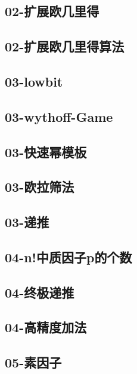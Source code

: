 \documentclass[10pt,a4paper]{article}
\begin{document}
\subsection{02-扩展欧几里得}

\subsection{02-扩展欧几里得算法}

\subsection{03-lowbit}

\subsection{03-wythoff-Game}

\subsection{03-快速幂模板}

\subsection{03-欧拉筛法}

\subsection{03-递推}

\subsection{04-n!中质因子p的个数}

\subsection{04-终极递推}

\subsection{04-高精度加法}

\subsection{05-素因子}

\end{document}
